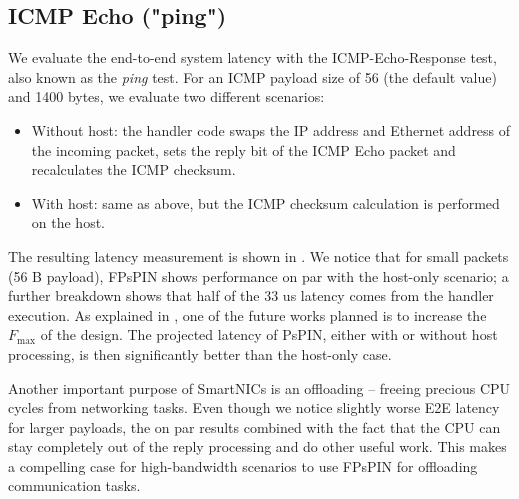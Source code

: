 
\subsection{ICMP Echo ("ping")}

We evaluate the end-to-end system latency with the ICMP-Echo-Response test, also known as the \emph{ping} test.  For an ICMP payload size of 56 (the default value) and 1400 bytes, we evaluate two different scenarios:

\begin{itemize}
    \item Without host: the handler code swaps the IP address and Ethernet address of the incoming packet, sets the reply bit of the ICMP Echo packet and recalculates the ICMP checksum.
    \item With host: same as above, but the ICMP checksum calculation is performed on the host.
\end{itemize}

The resulting latency measurement is shown in .  We notice that for small packets (56 B payload), FPsPIN shows performance on par with the host-only scenario; a further breakdown shows that half of the 33 us latency comes from the handler execution.  As explained in , one of the future works planned is to increase the $F_{\text{max}}$ of the design.  The projected latency of PsPIN, either with or without host processing, is then significantly better than the host-only case.

Another important purpose of SmartNICs is an offloading -- freeing precious CPU cycles from networking tasks.  Even though we notice slightly worse E2E latency for larger payloads, the on par results combined with the fact that the CPU can stay completely out of the reply processing and do other useful work.  This makes a compelling case for high-bandwidth scenarios to use FPsPIN for offloading communication tasks.

